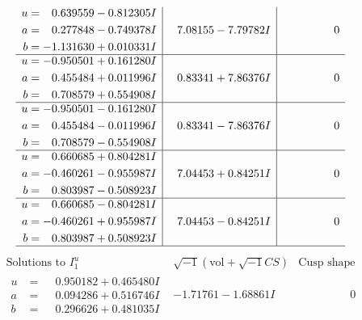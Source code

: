 \documentclass[1p]{elsarticle_modified}
\theoremstyle{definition}
\newcommand{\I}{\sqrt{-1}}
\begin{document}
$$\begin{array}{c|c|c}
\begin{aligned}
u &= \phantom{-}0.639559 - 0.812305 I \\
a &= \phantom{-}0.277848 - 0.749378 I \\
b &= -1.131630 + 0.010331 I\end{aligned}
 & \phantom{-}7.08155 - 7.79782 I & \phantom{-0.000000 } 0 \\ \hline\begin{aligned}
u &= -0.950501 + 0.161280 I \\
a &= \phantom{-}0.455484 + 0.011996 I \\
b &= \phantom{-}0.708579 + 0.554908 I\end{aligned}
 & \phantom{-}0.83341 + 7.86376 I & \phantom{-0.000000 } 0 \\ \hline\begin{aligned}
u &= -0.950501 - 0.161280 I \\
a &= \phantom{-}0.455484 - 0.011996 I \\
b &= \phantom{-}0.708579 - 0.554908 I\end{aligned}
 & \phantom{-}0.83341 - 7.86376 I & \phantom{-0.000000 } 0 \\ \hline\begin{aligned}
u &= \phantom{-}0.660685 + 0.804281 I \\
a &= -0.460261 - 0.955987 I \\
b &= \phantom{-}0.803987 - 0.508923 I\end{aligned}
 & \phantom{-}7.04453 + 0.84251 I & \phantom{-0.000000 } 0 \\ \hline\begin{aligned}
u &= \phantom{-}0.660685 - 0.804281 I \\
a &= -0.460261 + 0.955987 I \\
b &= \phantom{-}0.803987 + 0.508923 I\end{aligned}
 & \phantom{-}7.04453 - 0.84251 I & \phantom{-0.000000 } 0\\
 \hline 
 \end{array}$$\newpage$$\begin{array}{c|c|c}  
\text{Solutions to }I^u_{1}& \I (\text{vol} + \sqrt{-1}CS) & \text{Cusp shape}\\
 \hline 
\begin{aligned}
u &= \phantom{-}0.950182 + 0.465480 I \\
a &= \phantom{-}0.094286 + 0.516746 I \\
b &= \phantom{-}0.296626 + 0.481035 I\end{aligned}
 & -1.71761 - 1.68861 I & \phantom{-0.000000 } 0 \\ \hline\begin{aligned}

\end{aligned}
\end{array}$$
\end{document}
